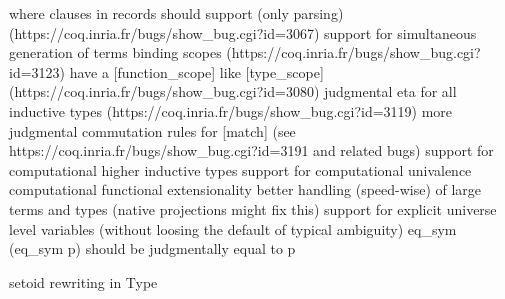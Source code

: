 \documentclass{beamer}
\begin{document}
\begin{frame}
where clauses in records should support (only parsing) (https://coq.inria.fr/bugs/show\_bug.cgi?id=3067)
support for simultaneous generation of terms binding scopes (https://coq.inria.fr/bugs/show\_bug.cgi?id=3123)
have a [function\_scope] like [type\_scope] (https://coq.inria.fr/bugs/show\_bug.cgi?id=3080)
judgmental eta for all inductive types (https://coq.inria.fr/bugs/show\_bug.cgi?id=3119)
more judgmental commutation rules for [match] (see https://coq.inria.fr/bugs/show\_bug.cgi?id=3191 and related bugs)
support for computational higher inductive types
support for computational univalence
computational functional extensionality
better handling (speed-wise) of large terms and types (native projections might fix this)
support for explicit universe level variables (without loosing the default of typical ambiguity)
eq\_sym (eq\_sym p) should be judgmentally equal to p

setoid rewriting in Type
\end{frame}
\end{document}
